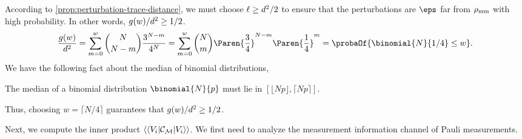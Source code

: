 According to \cref{prop:perturbation-trace-distance}, we must choose $\ell\ge d^2/2$ to ensure that the perturbations are $\eps$ far from ${\rho_{\text{mm}}}$ with high probability. In other words, $g(w)/d^2\ge 1/2$.
\[
\frac{g(w)}{\dims^2}=\sum_{m=0}^w{\nqubits \choose N-m}\frac{3^{N-m}}{4^\nqubits}=\sum_{m=0}^{w}{\nqubits \choose m}\Paren{\frac34}^{\nqubits-m}\Paren{\frac14}^m =\probaOf{\binomial{\nqubits}{1/4}\le w}.
\]
We have the following fact about the median of binomial distributions,
\begin{fact}
    The median of a binomial distribution $\binomial{N}{p}$ must lie in $[\lfloor Np\rfloor, \lceil Np\rceil]$.
\end{fact}
Thus, choosing $w=\lceil N/4\rceil$ guarantees that $g(w)/d^2\ge 1/2$. 

Next, we compute the inner product $\langle\langle V_i| {\mathcal{C}}_{\mathcal{M}} |V_i\rangle\rangle$. We first need to analyze the measurement information channel of Pauli measurements.

